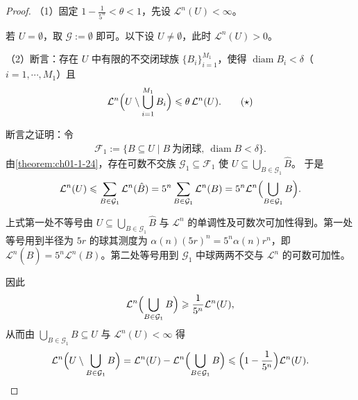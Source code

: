 \documentclass[../../main.tex]{subfiles}%
\begin{document}
\begin{proof}
（1）固定 $1-\frac{1}{5^n}<\theta<1$，先设 $\mathcal{L}^n(U)<\infty$。

若 $U=\emptyset$，取 $\mathcal{G}:=\emptyset$ 即可。以下设 $U\neq\emptyset$，此时 $\mathcal{L}^n(U)>0$。

（2）断言：存在 $U$ 中有限的不交闭球族 $\{B_i\}_{i=1}^{M_1}$，使得 $\operatorname{diam}B_i<\delta$（$i=1,\cdots,M_1$）且
\begin{align*}
\mathcal{L}^n\Bigl(U\setminus\bigcup_{i=1}^{M_1}B_i\Bigr)\leqslant\theta\,\mathcal{L}^n(U). \qquad(\star)
\end{align*}

断言之证明：令
\begin{align*}
\mathcal{F}_1:=\{B\subseteq U\mid B\ \text{为闭球},\ \operatorname{diam}B<\delta\}.
\end{align*}
由\cref{theorem:ch01-1-24}，存在可数不交族 $\mathcal{G}_1\subseteq\mathcal{F}_1$ 使 $U\subseteq\bigcup_{B\in\mathcal{G}_1}\hat B$。%
于是
\begin{align*}
\mathcal{L}^n(U)\leqslant\sum_{B\in\mathcal{G}_1}\mathcal{L}^n(\hat B)=5^n\sum_{B\in\mathcal{G}_1}\mathcal{L}^n(B)=5^n\mathcal{L}^n\Bigl(\bigcup_{B\in\mathcal{G}_1}B\Bigr).
\end{align*}

上式第一处不等号由 $U\subseteq\bigcup_{B\in\mathcal{G}_1}\hat B$ 与 $\mathcal{L}^n$ 的单调性及可数次可加性得到。第一处等号用到半径为 $5r$ 的球其测度为 $\alpha(n)(5r)^n=5^n\alpha(n)r^n$，即 $\mathcal{L}^n(\hat B)=5^n\mathcal{L}^n(B)$。第二处等号用到 $\mathcal{G}_1$ 中球两两不交与 $\mathcal{L}^n$ 的可数可加性。

因此
\begin{align*}
\mathcal{L}^n\Bigl(\bigcup_{B\in\mathcal{G}_1}B\Bigr)\geqslant\frac{1}{5^n}\mathcal{L}^n(U),
\end{align*}
从而由 $\bigcup_{B\in\mathcal{G}_1}B\subseteq U$ 与 $\mathcal{L}^n(U)<\infty$ 得
\begin{align*}
\mathcal{L}^n\Bigl(U\setminus\bigcup_{B\in\mathcal{G}_1}B\Bigr)
=\mathcal{L}^n(U)-\mathcal{L}^n\Bigl(\bigcup_{B\in\mathcal{G}_1}B\Bigr)
\leqslant\Bigl(1-\frac{1}{5^n}\Bigr)\mathcal{L}^n(U).
\end{align*}


\end{proof}
\end{document}
